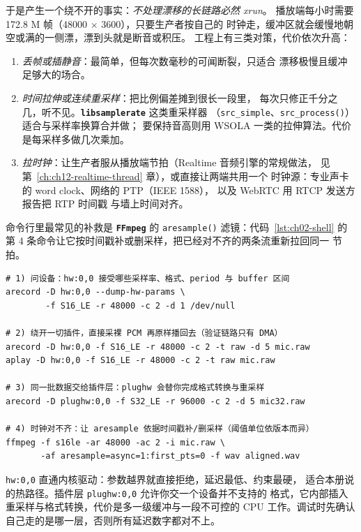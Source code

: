 \documentclass[12pt,a4paper,fontset=fandol]{ctexbook}
\newcommand{\Fn}[1]{\texttt{#1()}}
\newcommand{\Tp}[1]{\texttt{#1}}
\newcommand{\Lib}[1]{\textbf{\texttt{#1}}}
\newcommand{\Lang}[1]{\textsf{#1}}
\newcommand{\DomRT}{\Lang{Realtime}}
\begin{document}
于是产生一个绕不开的事实：\emph{不处理漂移的长链路必然 xrun}。
播放端每小时需要 172.8 M 帧（48000 $\times$ 3600），只要生产者按自己的
时钟走，缓冲区就会缓慢地朝空或满的一侧漂，漂到头就是断音或积压。
工程上有三类对策，代价依次升高：

\begin{enumerate}
  \item \emph{丢帧或插静音}：最简单，但每次数毫秒的可闻断裂，只适合
        漂移极慢且缓冲足够大的场合。
  \item \emph{时间拉伸或连续重采样}：把比例偏差摊到很长一段里，
        每次只修正千分之几，听不见。\Lib{libsamplerate}{} 这类重采样器
        （\Tp{src\_simple}、\Fn{src\_process}）适合与采样率换算合并做；
        要保持音高则用 WSOLA 一类的拉伸算法。代价是每采样多做几次乘加。
  \item \emph{拉时钟}：让生产者服从播放端节拍（\DomRT{} 音频引擎的常规做法，
        见第~\ref{ch:ch12-realtime-thread} 章），或直接让两端共用一个
        时钟源：专业声卡的 word clock、网络的 PTP（IEEE 1588），
        以及 \Lang{WebRTC}{} 用 RTCP 发送方报告把 RTP 时间戳
        与墙上时间对齐。
\end{enumerate}

命令行里最常见的补救是 \Lib{FFmpeg}{} 的 \Fn{aresample} 滤镜：代码~\ref{lst:ch02-shell}
的第 4 条命令让它按时间戳补或删采样，把已经对不齐的两条流重新拉回同一
节拍。

\begin{lstlisting}[style=shellstyle,
  caption={与设备能力、漂移补救有关的四条命令},
  label={lst:ch02-shell}]
# 1) 问设备：hw:0,0 接受哪些采样率、格式、period 与 buffer 区间
arecord -D hw:0,0 --dump-hw-params \
        -f S16_LE -r 48000 -c 2 -d 1 /dev/null

# 2) 绕开一切插件，直接采裸 PCM 再原样播回去（验证链路只有 DMA）
arecord -D hw:0,0 -f S16_LE -r 48000 -c 2 -t raw -d 5 mic.raw
aplay -D hw:0,0 -f S16_LE -r 48000 -c 2 -t raw mic.raw

# 3) 同一批数据交给插件层：plughw 会替你完成格式转换与重采样
arecord -D plughw:0,0 -f S32_LE -r 96000 -c 2 -d 5 mic32.raw

# 4) 时钟对不齐：让 aresample 依据时间戳补/删采样（阈值单位依版本而异）
ffmpeg -f s16le -ar 48000 -ac 2 -i mic.raw \
       -af aresample=async=1:first_pts=0 -f wav aligned.wav
\end{lstlisting}

\begin{note}[title={\Tp{plughw} 与 \Tp{hw} 的分工}]
\Tp{hw:0,0} 直通内核驱动：参数越界就直接拒绝，延迟最低、约束最硬，
适合本册说的热路径。插件层 \Tp{plughw:0,0} 允许你交一个设备并不支持的
格式，它内部插入重采样与格式转换，代价是多一级缓冲与一段不可控的 CPU
工作。调试时先确认自己走的是哪一层，否则所有延迟数字都对不上。
\end{note}
\end{document}
